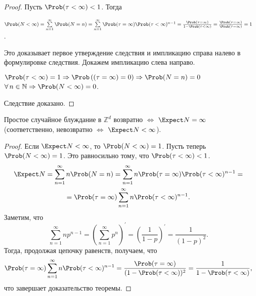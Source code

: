 \begin{proof}
  Пусть $\Prob(\tau < \infty) < 1$. Тогда
  \begin{flushleft}
    $\Prob(N < \infty) = \sum\limits_{n=1}^{\infty} \Prob(N = n) = \sum\limits_{n=1}^{\infty} \Prob(\tau = \infty) \Prob(\tau < \infty)^{n-1} = \frac{\Prob(\tau = \infty)}{1 - \Prob(\tau < \infty)} = \frac{\Prob(\tau = \infty)}{\Prob(\tau = \infty)} = 1$.
  \end{flushleft}
  Это доказывает первое утверждение следствия и импликацию справа налево в формулировке следствия. Докажем импликацию слева направо.
  \begin{flushleft}
    $\Prob(\tau < \infty) = 1 \Rightarrow \Prob \left((\tau = \infty ) = 0 \right) \Rightarrow \Prob(N = n) = 0$ $\forall\, n \in \mathbb{N} \Rightarrow \Prob(N < \infty) = 0$.
  \end{flushleft}
  Следствие доказано.
\end{proof}

\begin{thm}
  Простое случайное блуждание в $\mathbb{Z}^{d}$ возвратно $\Leftrightarrow$ $\Expect N = \infty$ (соответственно, невозвратно $\Leftrightarrow$ $\Expect N < \infty$).
\end{thm}

\begin{proof}
  Если $\Expect N < \infty$, то $\Prob(N<\infty) = 1$.
  Пусть теперь $\Prob(N<\infty) = 1$. Это равносильно тому, что $\Prob(\tau < \infty) < 1$.
  \begin{multline*}
    \Expect N = \sum_{n=1}^{\infty} n\Prob(N=n) = \sum\limits_{n=1}^{\infty} n\Prob(\tau = \infty)\Prob(\tau < \infty)^{n-1} = \\ =\Prob(\tau = \infty)\sum\limits_{n=1}^{\infty} n\Prob(\tau < \infty)^{n-1}.
  \end{multline*}
  Заметим, что
  \begin{equation*}
    \sum_{n=1}^{\infty} np^{n-1} = (\sum\limits_{n=1}^{\infty} p^{n})^{\prime} = (\frac{1}{1-p})^{\prime} = \frac{1}{(1-p)^{2}}.
  \end{equation*}
  Тогда, продолжая цепочку равенств, получаем, что
  \begin{equation*}
    \Prob(\tau = \infty)\sum_{n=1}^{\infty} n\Prob(\tau < \infty)^{n-1} = \frac{\Prob(\tau = \infty)}{(1 - \Prob(\tau < \infty))^{2}} = \frac{1}{1 - \Prob(\tau < \infty)},
  \end{equation*}
  что завершает доказательство теоремы.
\end{proof}

